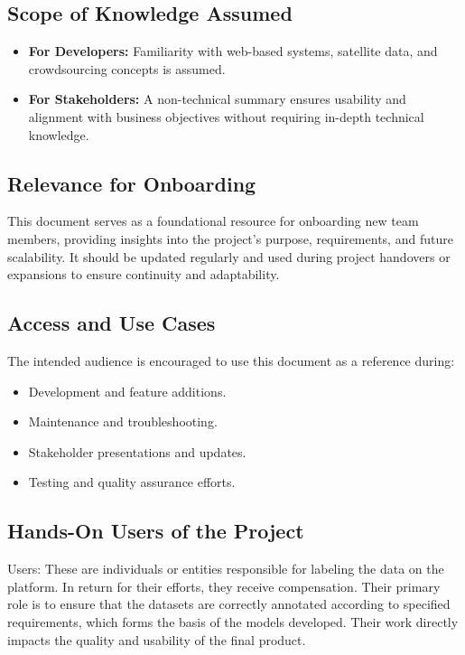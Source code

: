 \documentclass{article}
\begin{document}
\subsection{Scope of Knowledge Assumed}
\begin{itemize}
    \item \textbf{For Developers:} Familiarity with web-based systems, satellite data, and crowdsourcing concepts is assumed.
    \item \textbf{For Stakeholders:} A non-technical summary ensures usability and alignment with business objectives without requiring in-depth technical knowledge.
\end{itemize}

\subsection{Relevance for Onboarding}
This document serves as a foundational resource for onboarding new team members, providing insights into the project’s purpose, requirements, and future scalability. It should be updated regularly and used during project handovers or expansions to ensure continuity and adaptability.

\subsection{Access and Use Cases}
The intended audience is encouraged to use this document as a reference during:
\begin{itemize}
    \item Development and feature additions.
    \item Maintenance and troubleshooting.
    \item Stakeholder presentations and updates.
    \item Testing and quality assurance efforts.
\end{itemize}


\subsection{Hands-On Users of the Project}
Users: These are individuals or entities responsible for labeling the data on the platform. In return for their efforts, they receive compensation. Their primary role is to ensure that the datasets are correctly annotated according to specified requirements, which forms the basis of the models developed. Their work directly impacts the quality and usability of the final product.
\end{document}

